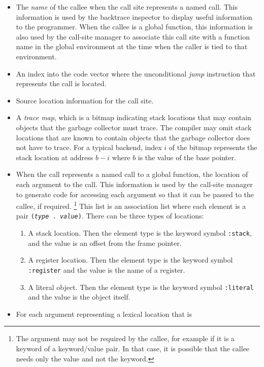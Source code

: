 \begin{itemize}
\item The \emph{name} of the callee when the call site represents a
  named call.  This information is used by the backtrace inspector to
  display useful information to the programmer.  When the callee is a
  global function, this information is also used by the call-site
  manager to associate this call site with a function name in the
  global environment at the time when the caller is tied to that
  environment.
\item An index into the code vector where the unconditional
  \emph{jump} instruction that represents the call is located.
\item Source location information for the call site.
\item A \emph{trace map}, which is a bitmap indicating stack locations
  that may contain objects that the garbage collector must trace.  The
  compiler may omit stack locations that are known to contain
  \commonlisp{} objects that the garbage collector does not have to
  trace.  For a typical backend, index $i$ of the bitmap represents
  the stack location at address $b-i$ where $b$ is the value of the
  base pointer.
\item When the call represents a named call to a global function, the
  location of each argument to the call.  This information is used by
  the call-site manager to generate code for accessing each argument
  so that it can be passed to the callee, if required.%
  \footnote{The argument may not be required by the callee, for
    example if it is a keyword of a keyword/value pair.  In that case,
    it is possible that the callee needs only the value and not the
    keyword.}
  This list is an association list where each element is a pair
  \texttt{(\emph{type} . \emph{value})}.
  There can be three types of locations:
  \begin{enumerate}
  \item A stack location.  Then the element type is the keyword symbol
    \texttt{:stack}, and the value is an offset from the frame
    pointer.
  \item A register location. Then the element type is the keyword
    symbol \texttt{:register} and the value is the name of a
    register.
  \item A literal object.  Then the element type is the keyword symbol
    \texttt{:literal} and the value is the object itself.
  \end{enumerate}
\item For each argument representing a lexical location that is

\end{itemize}
